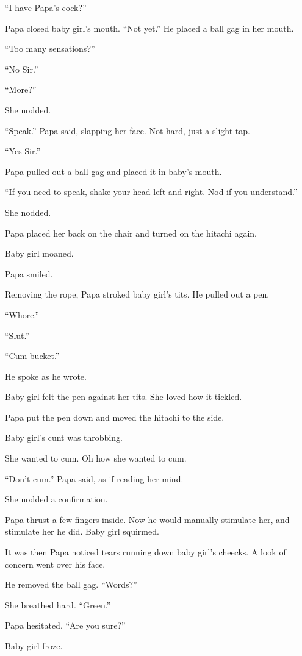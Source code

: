     “I have Papa’s cock?”

    Papa closed baby girl’s mouth. “Not yet.” He placed a ball gag in her mouth.

    “Too many sensations?”

    “No Sir.”

    “More?”

    She nodded.

    “Speak.” Papa said, slapping her face. Not hard, just a slight tap.

    “Yes Sir.”

    Papa pulled out a ball gag and placed it in baby’s mouth.

    “If you need to speak, shake your head left and right. Nod if you understand.”

    She nodded.

    Papa placed her back on the chair and turned on the hitachi again.

    Baby girl moaned.

    Papa smiled.

    Removing the rope, Papa stroked baby girl’s tits. He pulled out a pen.

    “Whore.”

    “Slut.”

    “Cum bucket.”

    He spoke as he wrote.

    Baby girl felt the pen against her tits. She loved how it tickled.

    Papa put the pen down and moved the hitachi to the side.

    Baby girl’s cunt was throbbing.

    She wanted to cum. Oh how she wanted to cum.

    “Don’t cum.” Papa said, as if reading her mind.

    She nodded a confirmation.

    Papa thrust a few fingers inside. Now he would manually stimulate her, and stimulate her he did. Baby girl squirmed.

    It was then Papa noticed tears running down baby girl’s cheecks. A look of concern went over his face.

    He removed the ball gag. “Words?”

    She breathed hard. “Green.”

    Papa hesitated. “Are you sure?”

    Baby girl froze.

